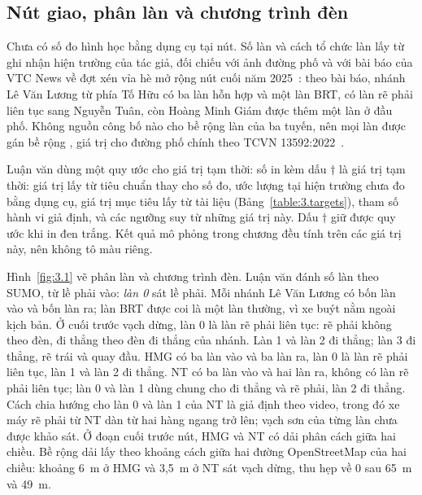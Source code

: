 \documentclass[../main.tex]{subfiles}
\begin{document}
\subsection{Nút giao, phân làn và chương trình đèn}
\label{subsection:site_params}

Chưa có số đo hình học bằng dụng cụ tại nút. Số làn và cách tổ chức làn lấy từ ghi nhận hiện trường của tác giả, đối chiếu với ảnh đường phố và với bài báo của VTC News về đợt xén vỉa hè mở rộng nút cuối năm 2025~\cite{vtc2026xen}: theo bài báo, nhánh Lê Văn Lương từ phía Tố Hữu có ba làn hỗn hợp và một làn BRT, có làn rẽ phải liên tục sang Nguyễn Tuân, còn Hoàng Minh Giám được thêm một làn ở đầu phố. Không nguồn công bố nào cho bề rộng làn của ba tuyến, nên mọi làn được gán bề rộng , giá trị cho đường phố chính theo TCVN 13592:2022~\cite{tcvn13592}.

Luận văn dùng một quy ước cho giá trị tạm thời: số in  kèm dấu $\dagger$ là giá trị tạm thời: giá trị lấy từ tiêu chuẩn thay cho số đo, ước lượng tại hiện trường chưa đo bằng dụng cụ, giá trị mục tiêu lấy từ tài liệu (Bảng~\ref{table:3.targets}), tham số hành vi giả định, và các ngưỡng suy từ những giá trị này. Dấu $\dagger$ giữ được quy ước khi in đen trắng. Kết quả mô phỏng trong chương đều tính trên các giá trị này, nên không tô màu riêng.

Hình~\ref{fig:3.1} vẽ phân làn và chương trình đèn. Luận văn đánh số làn theo SUMO, từ lề phải vào: \emph{làn 0} sát lề phải. Mỗi nhánh Lê Văn Lương có bốn làn vào và bốn làn ra; làn BRT được coi là một làn thường, vì xe buýt nằm ngoài kịch bản. Ở  cuối trước vạch dừng, làn 0 là làn rẽ phải liên tục: rẽ phải không theo đèn, đi thẳng theo đèn đi thẳng của nhánh. Làn 1 và làn 2 đi thẳng; làn 3 đi thẳng, rẽ trái và quay đầu. HMG có ba làn vào và ba làn ra, làn 0 là làn rẽ phải liên tục, làn 1 và làn 2 đi thẳng. NT có ba làn vào và hai làn ra, không có làn rẽ phải liên tục; làn 0 và làn 1 dùng chung cho đi thẳng và rẽ phải, làn 2 đi thẳng. Cách chia hướng cho làn 0 và làn 1 của NT là giả định theo video, trong đó xe máy rẽ phải từ NT dàn từ hai hàng ngang trở lên; vạch sơn của từng làn chưa được khảo sát. Ở đoạn cuối trước nút, HMG và NT có dải phân cách giữa hai chiều. Bề rộng dải lấy theo khoảng cách giữa hai đường OpenStreetMap của hai chiều: khoảng 6~m ở HMG và 3,5~m ở NT sát vạch dừng, thu hẹp về 0 sau 65~m và 49~m.
\end{document}
